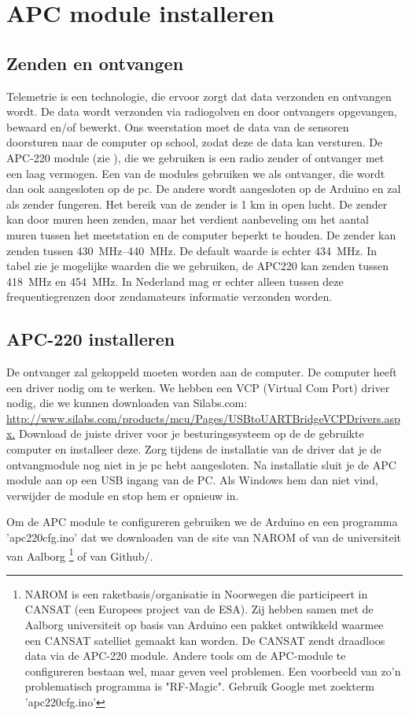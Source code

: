 \section{APC module installeren}

\subsection{Zenden en ontvangen} Telemetrie is een technologie, die
ervoor zorgt dat data verzonden en ontvangen wordt. De data wordt
verzonden via radiogolven en door ontvangers opgevangen, bewaard en/of
bewerkt. Ons weerstation moet de data van de sensoren doorsturen naar de
\hisparc computer op school, zodat deze de data kan versturen. De
APC-220 module (zie ), die we gebruiken is een
radio zender of ontvanger met een laag vermogen. Een van de modules
gebruiken we als ontvanger, die wordt dan ook aangesloten op de pc. De
andere wordt aangesloten op de Arduino en zal als zender fungeren. Het
bereik van de zender is 1 km in open lucht. De zender kan door muren heen
zenden, maar het verdient aanbeveling om het aantal muren tussen het
meetstation en de computer beperkt te houden. De zender kan zenden
tussen \SIrange{430}{440}{\MHz}. De default waarde is echter
\SI{434}{\MHz}. In tabel zie je mogelijke waarden die we gebruiken, de APC220 
kan zenden tussen \SI{418}{\MHz} en \SI{454}{\MHz}.
In Nederland mag er echter alleen tussen deze frequentiegrenzen door
zendamateurs informatie verzonden worden.


\subsection{APC-220 installeren}
De ontvanger zal gekoppeld moeten worden aan de computer. De computer heeft 
een driver nodig om te werken. We hebben een VCP (Virtual Com Port) driver nodig, 
die we kunnen downloaden van Silabs.com:
\url{http://www.silabs.com/products/mcu/Pages/USBtoUARTBridgeVCPDrivers.aspx.}
Download de juiste driver voor je besturingssysteem op de de gebruikte computer
en installeer deze. Zorg tijdens de installatie van de driver dat je de 
ontvangmodule nog niet in je pc hebt aangesloten.
Na installatie sluit je de APC module  aan op een 
USB ingang van de PC. Als Windows hem dan niet vind, verwijder de module en 
stop hem er opnieuw in.

Om de APC module te configureren gebruiken we de Arduino en een
programma 'apc220cfg.ino' dat we downloaden van de site van NAROM of van
de universiteit van Aalborg \footnote{NAROM is een
raketbasis/organisatie in Noorwegen die participeert in CANSAT (een
Europees project van de ESA). Zij hebben samen met de Aalborg
universiteit op basis van Arduino een pakket ontwikkeld waarmee een
CANSAT satelliet gemaakt kan worden. De CANSAT zendt draadloos data via
de APC-220 module. Andere tools om de APC-module te configureren bestaan
wel, maar geven veel problemen. Een voorbeeld van zo'n problematisch
programma is "RF-Magic". Gebruik Google met zoekterm 'apc220cfg.ino'} of van
Github/\hisparc. 

